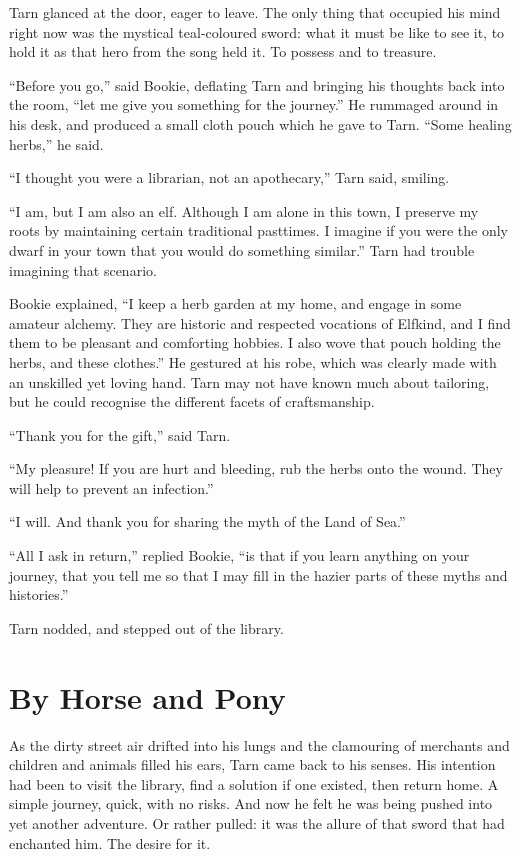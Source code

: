 Tarn glanced at the door, eager to leave.  The only thing that occupied his mind right now was the mystical teal-coloured sword: what it must be like to see it, to hold it as that hero from the song held it.  To possess and to treasure.

``Before you go,'' said Bookie, deflating Tarn and bringing his thoughts back into the room, ``let me give you something for the journey.''  He rummaged around in his desk, and produced a small cloth pouch which he gave to Tarn.  ``Some healing herbs,'' he said.

``I thought you were a librarian, not an apothecary,'' Tarn said, smiling.

``I am, but I am also an elf.  Although I am alone in this town, I preserve my roots by maintaining certain traditional pasttimes.  I imagine if you were the only dwarf in your town that you would do something similar.''  Tarn had trouble imagining that scenario.

Bookie explained, ``I keep a herb garden at my home, and engage in some amateur alchemy.  They are historic and respected vocations of Elfkind, and I find them to be pleasant and comforting hobbies.  I also wove that pouch holding the herbs, and these clothes.''  He gestured at his robe, which was clearly made with an unskilled yet loving hand.  Tarn may not have known much about tailoring, but he could recognise the different facets of craftsmanship.

``Thank you for the gift,'' said Tarn.

``My pleasure!  If you are hurt and bleeding, rub the herbs onto the wound.  They will help to prevent an infection.''

``I will.  And thank you for sharing the myth of the Land of Sea.''

``All I ask in return,'' replied Bookie, ``is that if you learn anything on your journey, that you tell me so that I may fill in the hazier parts of these myths and histories.''

Tarn nodded, and stepped out of the library.


\chapter{By Horse and Pony}
As the dirty street air drifted into his lungs and the clamouring of merchants and children and animals filled his ears, Tarn came back to his senses.  His intention had been to visit the library, find a solution if one existed, then return home.  A simple journey, quick, with no risks.  And now he felt he was being pushed into yet another adventure.  Or rather pulled: it was the allure of that sword that had enchanted him.  The desire for it.

